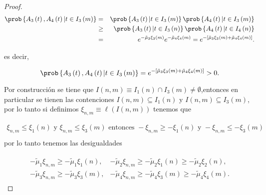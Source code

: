 \begin{proof}
\begin{eqnarray*}
\prob\left\{A_{3}\left(t\right),A_{4}\left(t\right)|t\in I_{3}\left(m\right)\right\}&=&
\prob\left\{A_{3}\left(t\right)|t\in I_{3}\left(m\right)\right\}
\prob\left\{A_{4}\left(t\right)|t\in I_{3}\left(m\right)\right\}\\
&\geq&
\prob\left\{A_{3}\left(t\right)|t\in I_{3}\left(n\right)\right\}
\prob\left\{A_{4}\left(t\right)|t\in I_{4}\left(n\right)\right\}\\
&=&e^{-\tilde{\mu}_{3}\xi_{3}\left(m\right)}e^{-\tilde{\mu}_{4}\xi_{4}
\left(m\right)}
=e^{-\left[\tilde{\mu}_{3}\xi_{3}\left(m\right)+\tilde{\mu}_{4}\xi_{4}
\left(m\right)\right]}.
\end{eqnarray*}


es decir, 

\begin{equation}
\prob\left\{A_{3}\left(t\right),A_{4}\left(t\right)|t\in I_{3}\left(m\right)\right\}
=e^{-\left[\tilde{\mu}_{3}\xi_{3}\left(m\right)+\tilde{\mu}_{4}\xi_{4}
\left(m\right)\right]}>0.
\end{equation}

Por construcci\'on se tiene que $I\left(n,m\right)\equiv I_{1}\left(n\right)\cap I_{3}\left(m\right)\neq\emptyset$,entonces en particular se tienen las contenciones $I\left(n,m\right)\subseteq I_{1}\left(n\right)$ y $I\left(n,m\right)\subseteq I_{3}\left(m\right)$, por lo tanto si definimos $\xi_{n,m}\equiv\ell\left(I\left(n,m\right)\right)$ tenemos que

\begin{eqnarray*}
\xi_{n,m}\leq\xi_{1}\left(n\right)\textrm{ y }\xi_{n,m}\leq\xi_{3}\left(m\right)\textrm{ entonces }
-\xi_{n,m}\geq-\xi_{1}\left(n\right)\textrm{ y }-\xi_{n,m}\leq-\xi_{3}\left(m\right)\\
\end{eqnarray*}
por lo tanto tenemos las desigualdades 



\begin{eqnarray*}
\begin{array}{ll}
-\tilde{\mu}_{1}\xi_{n,m}\geq-\tilde{\mu}_{1}\xi_{1}\left(n\right),&
-\tilde{\mu}_{2}\xi_{n,m}\geq-\tilde{\mu}_{2}\xi_{1}\left(n\right)
\geq-\tilde{\mu}_{2}\xi_{2}\left(n\right),\\
-\tilde{\mu}_{3}\xi_{n,m}\geq-\tilde{\mu}_{3}\xi_{3}\left(m\right),&
-\tilde{\mu}_{4}\xi_{n,m}\geq-\tilde{\mu}_{4}\xi_{3}\left(m\right)
\geq-\tilde{\mu}_{4}\xi_{4}\left(m\right).
\end{array}
\end{eqnarray*}


\end{proof}
